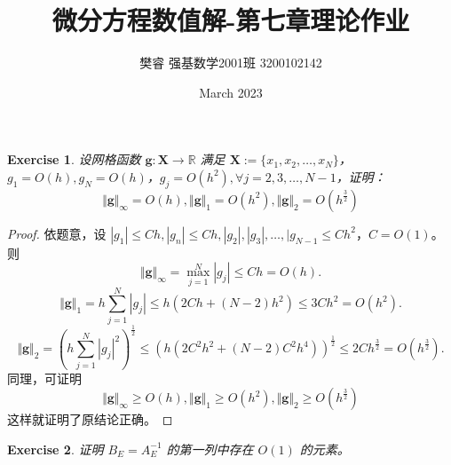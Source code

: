\documentclass{ctexart}
\title{微分方程数值解-第七章理论作业}
\author{樊睿 强基数学2001班 3200102142}
\date{March 2023}
\newtheorem{ex}{Exercise}
\begin{document}
\maketitle

\begin{ex}
    设网格函数 $\mathbf{g}:\mathbf{X}\rightarrow \mathbb{R}$ 满足 $\mathbf{X} :=\{x_1,x_2,\dots,x_N\}$，$g_1=O(h),g_N=O(h)$，$g_j=O(h^2),\forall j=2,3,\dots,N-1$，证明：
    \begin{equation}
        \Vert{\mathbf{g}}\Vert_\infty = O(h),\Vert{\mathbf{g}}\Vert_1 = O(h^2),\Vert{\mathbf{g}}\Vert_2 = O(h^{\frac 32})
    \end{equation}
\end{ex}

\begin{proof}
    依题意，设 $|g_1|\leq Ch,|g_n|\leq Ch,|g_2|,|g_3|,\dots,|g_{N-1}\leq Ch^2$，$C=O(1)$。则
    \begin{equation}
        \Vert{\mathbf{g}}\Vert_\infty = \max_{j=1}^N|g_j|\leq Ch = O(h).
    \end{equation}
    \begin{equation}
        \Vert{\mathbf{g}}\Vert_1 = h\sum_{j=1}^N|g_j| \leq h(2Ch+(N-2)h^2)\leq 3Ch^2 = O(h^2).
    \end{equation}
    \begin{equation}
        \Vert{\mathbf{g}}\Vert_2 = (h\sum_{j=1}^N|g_j|^2)^{\frac 12} \leq (h(2C^2h^2+(N-2)C^2h^4))^{\frac 12}\leq 2Ch^{\frac 32} = O(h^\frac 32).
    \end{equation}
    同理，可证明
    \begin{equation}
        \Vert{\mathbf{g}}\Vert_\infty \geq O(h),\Vert{\mathbf{g}}\Vert_1 \geq O(h^2),\Vert{\mathbf{g}}\Vert_2\geq O(h^{\frac 32})
    \end{equation}
    这样就证明了原结论正确。
\end{proof}

\begin{ex}
    证明 $B_E = A_E^{-1}$ 的第一列中存在 $O(1)$ 的元素。
\end{ex}
\end{document}
